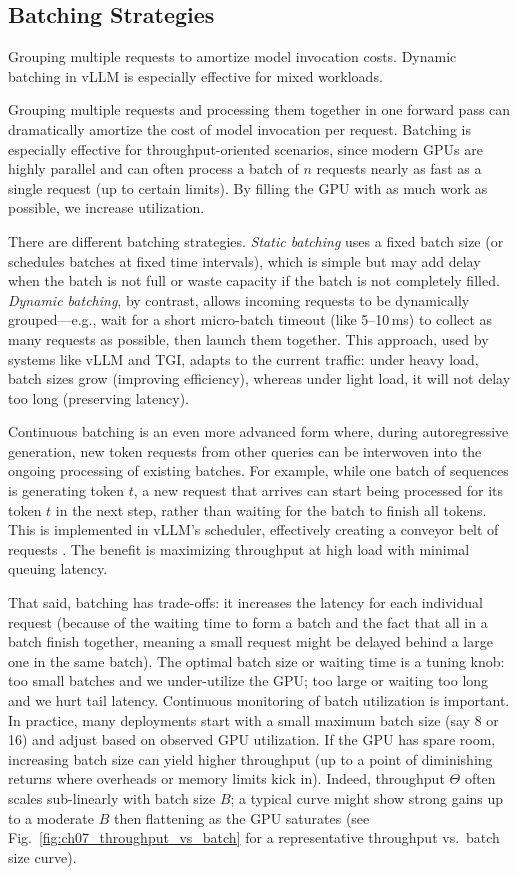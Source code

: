 \subsection{Batching Strategies}
\label{sec:perf-batching}
Grouping multiple requests to amortize model invocation costs. Dynamic batching in vLLM is especially effective for mixed workloads.

Grouping multiple requests and processing them together in one forward pass can dramatically amortize the cost of model invocation per request. Batching is especially effective for throughput-oriented scenarios, since modern GPUs are highly parallel and can often process a batch of $n$ requests nearly as fast as a single request (up to certain limits). By filling the GPU with as much work as possible, we increase utilization.

There are different batching strategies. \textit{Static batching} uses a fixed batch size (or schedules batches at fixed time intervals), which is simple but may add delay when the batch is not full or waste capacity if the batch is not completely filled. \textit{Dynamic batching}, by contrast, allows incoming requests to be dynamically grouped---e.g., wait for a short micro-batch timeout (like 5--10\,ms) to collect as many requests as possible, then launch them together. This approach, used by systems like vLLM and TGI, adapts to the current traffic: under heavy load, batch sizes grow (improving efficiency), whereas under light load, it will not delay too long (preserving latency).

Continuous batching is an even more advanced form where, during autoregressive generation, new token requests from other queries can be interwoven into the ongoing processing of existing batches. For example, while one batch of sequences is generating token $t$, a new request that arrives can start being processed for its token $t$ in the next step, rather than waiting for the batch to finish all tokens. This is implemented in vLLM’s scheduler, effectively creating a conveyor belt of requests \cite{Kwon2023vLLM}. The benefit is maximizing throughput at high load with minimal queuing latency.

That said, batching has trade-offs: it increases the latency for each individual request (because of the waiting time to form a batch and the fact that all in a batch finish together, meaning a small request might be delayed behind a large one in the same batch). The optimal batch size or waiting time is a tuning knob: too small batches and we under-utilize the GPU; too large or waiting too long and we hurt tail latency. Continuous monitoring of batch utilization is important. In practice, many deployments start with a small maximum batch size (say 8 or 16) and adjust based on observed GPU utilization. If the GPU has spare room, increasing batch size can yield higher throughput (up to a point of diminishing returns where overheads or memory limits kick in). Indeed, throughput $\Theta$ often scales sub-linearly with batch size $B$; a typical curve might show strong gains up to a moderate $B$ then flattening as the GPU saturates (see Fig.~\ref{fig:ch07_throughput_vs_batch} for a representative throughput vs.\ batch size curve).

